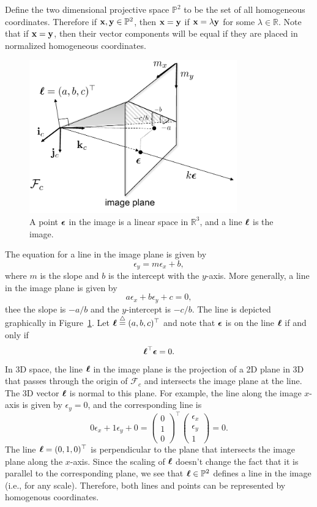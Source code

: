 Define the two dimensional projective space $\mathbb{P}^2$ to be the set of all homogeneous coordinates.\cite{HartleyZisserman03}  Therefore if $\mathbf{x}, \mathbf{y} \in \mathbb{P}^2$, then $\mathbf{x}=\mathbf{y}$ if $\mathbf{x} = \lambda \mathbf{y}$ for some $\lambda\in\mathbb{R}$.  
Note that if $\mathbf{x}=\mathbf{y}$, then their vector components will be equal if they are placed in normalized homogeneous coordinates.  
\begin{figure}
	\centering
	\includegraphics[width=0.8\textwidth]{chap6_camera_features/figures/point_and_line}
	\caption{A point $\boldsymbol{\epsilon}$ in the image is a linear space in $\mathbb{R}^3$, and a line $\boldsymbol{\ell}$ is the image.}
	\label{fig:point_and_line}
\end{figure}

The equation for a line in the image plane is given by
\[
\epsilon_y = m\epsilon_x + b,
\]
where $m$ is the slope and $b$ is the intercept with the $y$-axis.  More generally, a line in the image plane is given by
\[
a \epsilon_x + b\epsilon_y + c = 0,
\]
thee the slope is $-a/b$ and the $y$-intercept is $-c/b$.  The line is depicted graphically in Figure~\ref{fig:point_and_line}.  Let $\boldsymbol{\ell} \stackrel{\triangle}{=} (a, b, c)^\top$ and note that $\boldsymbol{\epsilon}$ is on the line $\boldsymbol{\ell}$ if and only if
\[
\boldsymbol{\ell}^\top \boldsymbol{\epsilon} = 0.
\]
In 3D space, the line $\boldsymbol{\ell}$ in the image plane is the projection of a 2D plane in 3D that passes through the origin of $\mathcal{F}_c$ and intersects the image plane at the line.  The 3D vector $\boldsymbol{\ell}$ is normal to this plane.  For example, the line along the image $x$-axis is given by $\epsilon_y=0$, and the corresponding line is 
\[
0\epsilon_x + 1 \epsilon_y + 0 = \begin{pmatrix}0 \\ 1 \\ 0\end{pmatrix}^\top \begin{pmatrix}\epsilon_x \\ \epsilon_y \\ 1 \end{pmatrix}=0.
\]
The line $\boldsymbol{\ell}=(0, 1, 0)^\top$ is perpendicular to the plane that intersects the image plane along the $x$-axis.  Since the scaling of $\boldsymbol{\ell}$ doesn't change the fact that it is parallel to the corresponding plane, we see that $\boldsymbol{\ell} \in \mathbb{P}^2$ defines a line in the image (i.e., for any scale).  Therefore, both lines and points can be represented by homogenous coordinates.  

